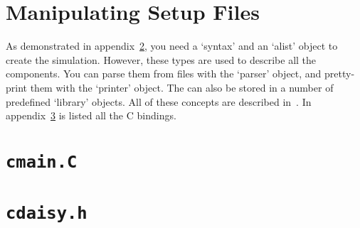 \documentclass[a4paper,10pt,titlepage]{article}
\begin{document}
\section{Manipulating Setup Files}

As demonstrated in appendix~\ref{cmain}, you need a `syntax' and an
`alist' object to create the simulation.  However, these types are
used to describe all the \daisy{} components.  You can parse them from
files with the `parser' object, and pretty-print them with the
`printer' object.  The can also be stored in a number of predefined
`library' objects.  All of these concepts are described
in~\cite{daisy-guide}.  In appendix~\ref{cdaisy} is listed all the C
bindings. 

\appendix{}

\section{\texttt{cmain.C}}
\label{cmain}



\section{\texttt{cdaisy.h}}
\label{cdaisy}





\end{document}
